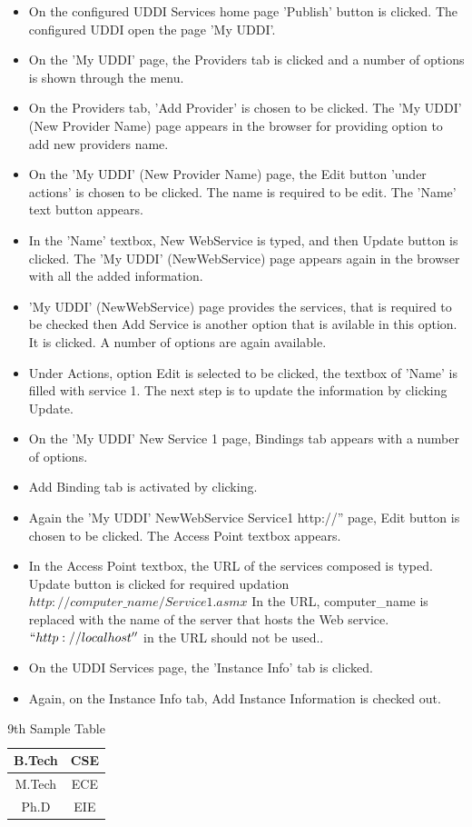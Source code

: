 \begin{itemize}
\item On the configured UDDI Services home page 'Publish' button is clicked. The configured UDDI open the page 'My UDDI'.
\item On the 'My UDDI' page, the Providers tab is clicked and a number of options is shown through the menu.
\item On the Providers tab, 'Add Provider' is chosen to be clicked. The 'My UDDI' (New Provider Name) page appears in the browser for 
providing option to add new providers name. 
\item On the 'My UDDI' (New Provider Name) page, the Edit button 'under actions' is chosen to be clicked. The name is required to be edit. The 'Name' text button
appears.
\item In the 'Name' textbox,  New WebService is typed, and then Update button is clicked. The 'My UDDI' (NewWebService) page appears again in the browser with all the added information.
\item 'My UDDI' (NewWebService) page provides the services, that is required to be checked then Add Service is another option that is avilable
in this option. It is clicked. A number of options are again available.
\item Under Actions, option Edit is selected to be clicked, the textbox of 'Name' is filled with service 1. The next step is to update 
the information by clicking Update.
\item  On the 'My UDDI' New Service 1 page, Bindings tab appears with a number of options.
\item Add Binding tab is activated by clicking.
\item Again the 'My UDDI' NewWebService Service1 http://'' page, Edit button is chosen to be clicked. The Access Point textbox appears.
\item In the Access Point textbox, the URL of the services composed is typed. Update button is clicked for required updation 
$http://computer\_name/Service1.asmx$
In the URL, computer\_name is replaced with the name of the server that hosts the Web service. $``http://localhost''$ in the URL should not be used..
\item On the UDDI Services page, the 'Instance Info' tab is clicked.
\item Again, on the Instance Info tab, Add Instance Information is checked out. 
\end{itemize}

\begin{table}
 \begin{center}
 \caption{9th Sample Table}
 \begin{tabular}{|c|c|}
 \hline
 B.Tech & CSE\\
 \hline
 M.Tech & ECE\\
 \hline
 Ph.D & EIE\\
 \hline 
 \end{tabular}
 \end{center}
\end{table}

